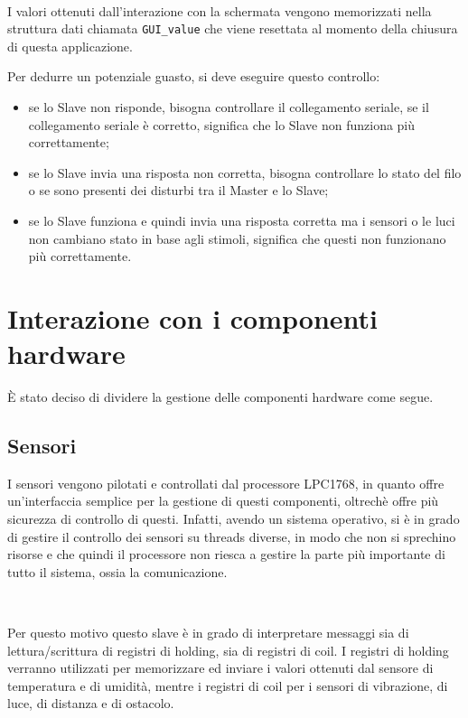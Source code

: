 \documentclass[a4paper,titlepage]{book}
\newcommand{\itema}{\begin{itemize}[noitemsep,topsep=10pt,parsep=5pt,partopsep=10pt]}
\newcommand{\code}{\lstinline}
\begin{document}
~

I valori ottenuti dall'interazione con la schermata vengono memorizzati nella struttura dati chiamata \code!GUI_value! che viene resettata al momento della chiusura di questa applicazione.

Per dedurre un potenziale guasto, si deve eseguire questo controllo:

\itema

\item se lo Slave non risponde, bisogna controllare il collegamento seriale, se il collegamento seriale è corretto, significa che lo Slave non funziona più correttamente;

\item se lo Slave invia una risposta non corretta, bisogna controllare lo stato del filo o se sono presenti dei disturbi tra il Master e lo Slave;

\item se lo Slave funziona e quindi invia una risposta corretta ma i sensori o le luci non cambiano stato in base agli stimoli, significa che questi non funzionano più correttamente.

\end{itemize}

\section{Interazione con i componenti hardware}

È stato deciso di dividere la gestione delle componenti hardware come segue.

\subsection{Sensori}

I sensori vengono pilotati e controllati dal processore LPC1768, in quanto offre un'interfaccia semplice per la gestione di questi componenti, oltrechè offre più sicurezza di controllo di questi. Infatti, avendo un sistema operativo, si è in grado di gestire il controllo dei sensori su threads diverse, in modo che non si sprechino risorse e che quindi il processore non riesca a gestire la parte più importante di tutto il sistema, ossia la comunicazione.

~

Per questo motivo questo slave è in grado di interpretare messaggi sia di lettura/scrittura di registri di holding, sia di registri di coil. I registri di holding verranno utilizzati per memorizzare ed inviare i valori ottenuti dal sensore di temperatura e di umidità, mentre i registri di coil per i sensori di vibrazione, di luce, di distanza e di ostacolo.
\end{document}
